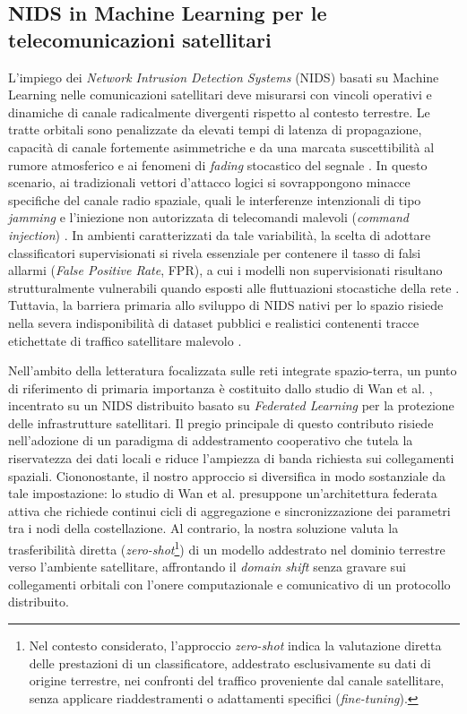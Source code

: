 \subsection{NIDS in Machine Learning per le telecomunicazioni satellitari}
\label{subsec:ids_satellitari}

L'impiego dei \textit{Network Intrusion Detection Systems} (NIDS) basati su Machine Learning nelle comunicazioni satellitari deve misurarsi con vincoli operativi e dinamiche di canale radicalmente divergenti rispetto al contesto terrestre. 
Le tratte orbitali sono penalizzate da elevati tempi di latenza di propagazione, capacità di canale fortemente asimmetriche e da una marcata suscettibilità al rumore atmosferico e ai fenomeni di \textit{fading} stocastico del segnale \cite{kodheli2021}. 
In questo scenario, ai tradizionali vettori d'attacco logici si sovrappongono minacce specifiche del canale radio spaziale, quali le interferenze intenzionali di tipo \textit{jamming} e l'iniezione non autorizzata di telecomandi malevoli (\textit{command injection}) \cite{nist2022}. 
In ambienti caratterizzati da tale variabilità, la scelta di adottare classificatori supervisionati si rivela essenziale per contenere il tasso di falsi allarmi (\textit{False Positive Rate}, FPR), a cui i modelli non supervisionati risultano strutturalmente vulnerabili quando esposti alle fluttuazioni stocastiche della rete \cite{khraisat2019, kodheli2021}. 
Tuttavia, la barriera primaria allo sviluppo di NIDS nativi per lo spazio risiede nella severa indisponibilità di dataset pubblici e realistici contenenti tracce etichettate di traffico satellitare malevolo \cite{azar2023}.

Nell'ambito della letteratura focalizzata sulle reti integrate spazio-terra, un punto di riferimento di primaria importanza è costituito dallo studio di Wan et al. \cite{wan2025}, incentrato su un NIDS distribuito basato su \textit{Federated Learning} per la protezione delle infrastrutture satellitari. 
Il pregio principale di questo contributo risiede nell'adozione di un paradigma di addestramento cooperativo che tutela la riservatezza dei dati locali e riduce l'ampiezza di banda richiesta sui collegamenti spaziali. 
Ciononostante, il nostro approccio si diversifica in modo sostanziale da tale impostazione: lo studio di Wan et al. presuppone un'architettura federata attiva che richiede continui cicli di aggregazione e sincronizzazione dei parametri tra i nodi della costellazione. 
Al contrario, la nostra soluzione valuta la trasferibilità diretta (\textit{zero-shot}\footnote{Nel contesto considerato, l'approccio \textit{zero-shot} indica la valutazione diretta delle prestazioni di un classificatore, addestrato esclusivamente su dati di origine terrestre, nei confronti del traffico proveniente dal canale satellitare, senza applicare riaddestramenti o adattamenti specifici (\textit{fine-tuning}).}) di un modello addestrato nel dominio terrestre verso l'ambiente satellitare, affrontando il \textit{domain shift} senza gravare sui collegamenti orbitali con l'onere computazionale e comunicativo di un protocollo distribuito.

